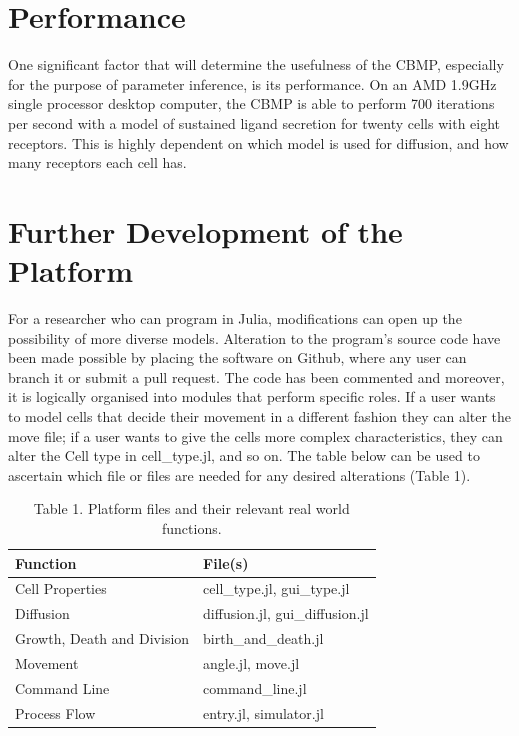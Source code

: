 \documentclass[12pt]{article}
\begin{document}
\section{Performance}

One significant factor that will determine the usefulness of the CBMP, 
especially for the purpose of parameter inference, is its performance. 
On an AMD 1.9GHz single processor desktop computer, the CBMP is able to 
perform 700 iterations per second with a model of sustained ligand 
secretion for twenty cells with eight receptors. This is highly 
dependent on which model is used for diffusion, and how many receptors 
each cell has.

\section{Further Development of the Platform}
For a researcher who can program in Julia, modifications can open up the 
possibility of more diverse models. Alteration to the program's source 
code have been made possible by placing the software on Github, where 
any user can branch it or submit a pull request. The code has been 
commented and moreover, it is logically organised into modules that 
perform specific roles. If a user wants to model cells that decide their 
movement in a different fashion they can alter the move file; if a user 
wants to give the cells more complex characteristics, they can alter the 
Cell type in cell\_type.jl, and so on. The table below can be used to 
ascertain which file or files are needed for any desired alterations 
(Table 1).

\begin{table}[H]
\centering
\begin{tabular}{ll}
\hline
{\bfseries Function} & {\bfseries File(s)} \\
\hline
Cell Properties & cell\_type.jl, gui\_type.jl \\
Diffusion & diffusion.jl, gui\_diffusion.jl \\
Growth, Death and Division & birth\_and\_death.jl \\
Movement & angle.jl, move.jl \\
Command Line & command\_line.jl \\
Process Flow & entry.jl, simulator.jl \\
\hline
\end{tabular}
\caption{Table 1. Platform files and their relevant real world 
functions.}
\end{table}
\end{document}

